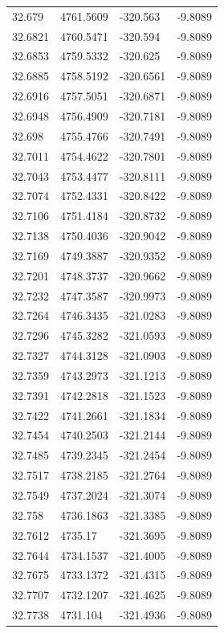 \begin{table}[H]
\begin{tabular}{llll}
32.679 & 4761.5609 & -320.563 & -9.8089 \\
32.6821 & 4760.5471 & -320.594 & -9.8089 \\
32.6853 & 4759.5332 & -320.625 & -9.8089 \\
32.6885 & 4758.5192 & -320.6561 & -9.8089 \\
32.6916 & 4757.5051 & -320.6871 & -9.8089 \\
32.6948 & 4756.4909 & -320.7181 & -9.8089 \\
32.698 & 4755.4766 & -320.7491 & -9.8089 \\
32.7011 & 4754.4622 & -320.7801 & -9.8089 \\
32.7043 & 4753.4477 & -320.8111 & -9.8089 \\
32.7074 & 4752.4331 & -320.8422 & -9.8089 \\
32.7106 & 4751.4184 & -320.8732 & -9.8089 \\
32.7138 & 4750.4036 & -320.9042 & -9.8089 \\
32.7169 & 4749.3887 & -320.9352 & -9.8089 \\
32.7201 & 4748.3737 & -320.9662 & -9.8089 \\
32.7232 & 4747.3587 & -320.9973 & -9.8089 \\
32.7264 & 4746.3435 & -321.0283 & -9.8089 \\
32.7296 & 4745.3282 & -321.0593 & -9.8089 \\
32.7327 & 4744.3128 & -321.0903 & -9.8089 \\
32.7359 & 4743.2973 & -321.1213 & -9.8089 \\
32.7391 & 4742.2818 & -321.1523 & -9.8089 \\
32.7422 & 4741.2661 & -321.1834 & -9.8089 \\
32.7454 & 4740.2503 & -321.2144 & -9.8089 \\
32.7485 & 4739.2345 & -321.2454 & -9.8089 \\
32.7517 & 4738.2185 & -321.2764 & -9.8089 \\
32.7549 & 4737.2024 & -321.3074 & -9.8089 \\
32.758 & 4736.1863 & -321.3385 & -9.8089 \\
32.7612 & 4735.17 & -321.3695 & -9.8089 \\
32.7644 & 4734.1537 & -321.4005 & -9.8089 \\
32.7675 & 4733.1372 & -321.4315 & -9.8089 \\
32.7707 & 4732.1207 & -321.4625 & -9.8089 \\
32.7738 & 4731.104 & -321.4936 & -9.8089 \\

\end{tabular}
\end{table}
